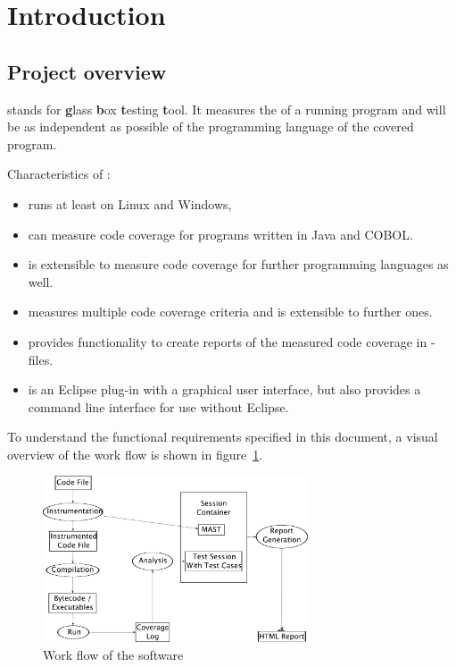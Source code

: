 \section{Introduction} \label{Introduction}

\subsection{Project overview} \label{in:Overview}
\gbt stands for \textbf{g}lass \textbf{b}ox \textbf{t}esting \textbf{t}ool. It measures the  of a running program and will be as independent as possible of the programming language of the covered program.
\par
Characteristics of \gbt:
\begin{itemize}
  \item \gbt runs at least on Linux and Windows,
  \item \gbt can measure code coverage for programs written in Java and COBOL.
  \item \gbt is extensible to measure code coverage for further programming languages as well.
  \item \gbt measures multiple code coverage criteria and is extensible to further ones.
  \item \gbt provides functionality to create reports of the measured code coverage in -files.
  \item \gbt is an Eclipse plug-in with a graphical user interface, but also provides a command line interface for use without Eclipse.
\end{itemize}
\par
To understand the functional requirements specified in this document, a visual overview of the work flow is shown in figure~\ref{in_fg:Workflow of the software}.
\begin{figure}[hbtp]
 \centering
 \includegraphics[width=0.7\textwidth]{images/Workflow/Workflow}
 \caption{Work flow of the software}
 \label{in_fg:Workflow of the software}
\end{figure}
